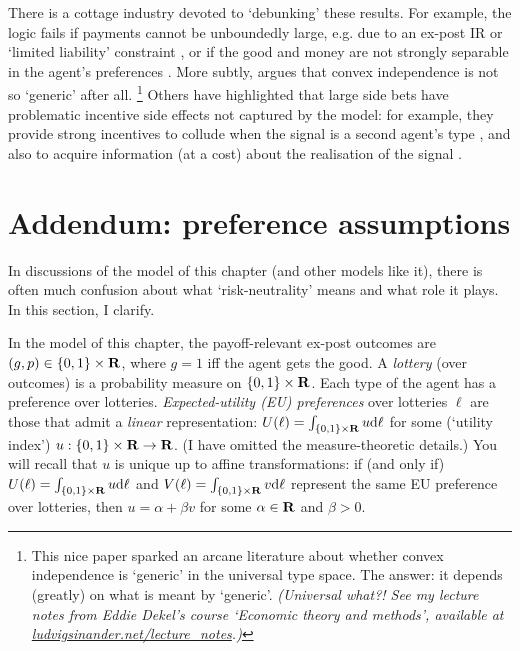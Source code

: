 There is a cottage industry devoted to `debunking' these results.
For example, the logic fails if payments cannot be unboundedly large, e.g. due to an ex-post IR or `limited liability' constraint \parencite{Robert1991},
or if the good and money are not strongly separable in the agent's preferences \parencite{Robert1991,Eso2005}.
More subtly, \textcite{Neeman2004} argues that convex independence is not so `generic' after all.%
	\footnote{This nice paper sparked an arcane literature about whether convex independence is `generic' in the universal type space.
	The answer: it depends (greatly) on what is meant by `generic'.
	\emph{(Universal what?! See my lecture notes from Eddie Dekel's course `Economic theory and methods', available at \href{https://ludvigsinander.net/lecture_notes}{ludvigsinander.net/lecture\_notes}.)}}
Others have highlighted that large side bets have problematic incentive side effects not captured by the model:
for example,
they provide strong incentives to collude when the signal is a second agent's type \parencite{LaffontMartimort2000},
and also to acquire information (at a cost) about the realisation of the signal \parencite{Laohakunakorn2019}.



\section{Addendum: preference assumptions}
\label{sec:ch1:risk-neutrality}

In discussions of the model of this chapter (and other models like it), there is often much confusion about what `risk-neutrality' means and what role it plays. In this section, I clarify.

In the model of this chapter, the payoff-relevant ex-post outcomes are $(g,p) \in \{0,1\} \times \mathbf{R}$, where $g=1$ iff the agent gets the good.
A \emph{lottery} (over outcomes) is a probability measure on $\{0,1\} \times \mathbf{R}$.
Each type of the agent has a preference over lotteries.
\emph{Expected-utility (EU) preferences} over lotteries $\ell$ are those that admit a \emph{linear} representation:
$U(\ell) = \int_{\{0,1\} \times \mathbf{R}} u \mathrm{d} \ell$
for some (`utility index') $u : \{0,1\} \times \mathbf{R} \to \mathbf{R}$.
(I have omitted the measure-theoretic details.)
You will recall that $u$ is unique up to affine transformations:
if (and only if) $U(\ell) = \int_{\{0,1\} \times \mathbf{R}} u \mathrm{d} \ell$
and $V(\ell) = \int_{\{0,1\} \times \mathbf{R}} v \mathrm{d} \ell$ represent the same EU preference over lotteries, then $u = \alpha + \beta v$ for some $\alpha \in \mathbf{R}$ and $\beta>0$.

